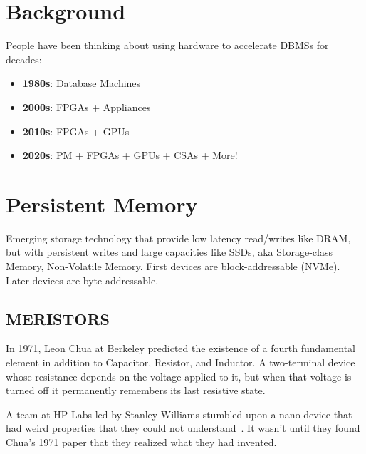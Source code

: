 \documentclass[11pt]{article}
\begin{document}
\maketitle
\thispagestyle{plain}

\section{Background}
People have been thinking about using hardware to accelerate DBMSs for decades:
\begin{itemize}
	\item \textbf{1980s}: Database Machines
	\item \textbf{2000s}: FPGAs + Appliances
	\item \textbf{2010s}: FPGAs + GPUs
	\item \textbf{2020s}: PM + FPGAs + GPUs + CSAs + More!
\end{itemize}


\section{Persistent Memory}
Emerging storage technology that provide low latency read/writes like DRAM, but with persistent writes and large capacities like SSDs, aka Storage-class Memory, Non-Volatile Memory. First devices are block-addressable (NVMe). Later devices are byte-addressable.

\subsection*{MERISTORS}
In 1971, Leon Chua at Berkeley predicted the existence of a fourth fundamental element in addition to Capacitor, Resistor, and Inductor. A two-terminal device whose resistance depends on the voltage applied to it, but when that voltage is turned off it permanently remembers its last resistive state.

A team at HP Labs led by Stanley Williams stumbled upon a nano-device that had weird properties that they could not understand~\cite{Williams2008}. It wasn’t until they found Chua’s 1971 paper that they realized what they had invented.
\end{document}

